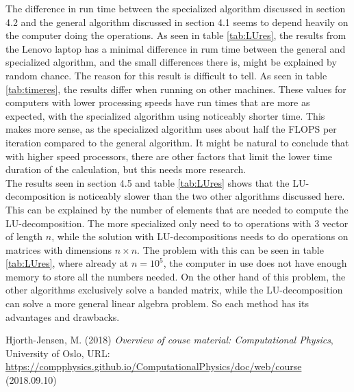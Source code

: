 \documentclass[a4paper,10pt]{article}
\begin{document}
The difference in run time between the specialized algorithm discussed in section 4.2 and the general algorithm discussed in section 4.1 seems to depend heavily on the computer doing the operations. As seen in table \ref{tab:LUres}, the results from the Lenovo laptop has a minimal difference in rum time between the general and specialized algorithm, and the small differences there is, might be explained by random chance. The reason for this result is difficult to tell. As seen in table \ref{tab:timeres}, the results differ when running on other machines. These values for computers with lower processing speeds have run times that are more as expected, with the specialized algorithm using noticeably shorter time. This makes more sense, as the specialized algorithm uses about half the FLOPS per iteration compared to the general algorithm. It might be natural to conclude that with higher speed processors, there are other factors that limit the lower time duration of the calculation, but this needs more research.\\


The results seen in section 4.5 and table \ref{tab:LUres} shows that the LU-decomposition is noticeably slower than the two other algorithms discussed here. This can be explained by the number of elements that are needed to compute the LU-decomposition. The more specialized only need to to operations with 3 vector of length $n$, while the solution with LU-decompositions needs to do operations on matrices with dimensions $n\times n$. The problem with this can be seen in table \ref{tab:LUres}, where already at $n = 10^5$, the computer in use does not have enough memory to store all the numbers needed. On the other hand of this problem, the other algorithms exclusively solve a banded matrix, while the LU-decomposition can solve a more general linear algebra problem. So each method has its advantages and drawbacks.


\begin{thebibliography}{9}

  Hjorth-Jensen, M. (2018) \textit{Overview of couse material: Computational Physics}, University of Oslo, URL: \url{https://compphysics.github.io/ComputationalPhysics/doc/web/course} (2018.09.10)

\end{thebibliography}
\end{document}
